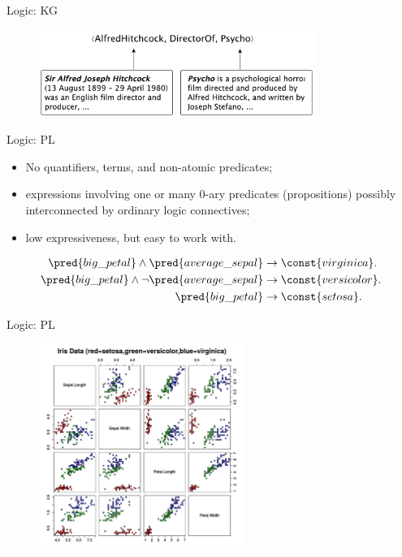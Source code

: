 \documentclass[presentation]{beamer}\mode<presentation>{\usetheme{AMSBolognaFC}}
\begin{document}
\begin{frame}[c]{Logic: KG}
    \begin{figure}
        \centering
        \includegraphics[width=0.8\textwidth]{figures/kg-example}
    \end{figure}    
\end{frame}

\begin{frame}[c]{Logic: PL}
    \begin{itemize}
        \item No quantifiers, terms, and non-atomic predicates;
        \item expressions involving one or many 0-ary predicates (propositions) possibly interconnected by ordinary logic connectives;
        \item low expressiveness, but easy to work with.
    \end{itemize}
    \vfill\centering
    \begin{equation*}
        \begin{aligned}
            \pred{big\_petal}\wedge\pred{average\_sepal}&\rightarrow\const{virginica}.\\
            \pred{big\_petal}\wedge\neg\pred{average\_sepal}&\rightarrow\const{versicolor}.\\
            \pred{big\_petal}&\rightarrow\const{setosa}. 
        \end{aligned}    
    \end{equation*}
\end{frame}

\begin{frame}[c]{Logic: PL}
    \begin{figure}
        \centering
        \includegraphics[width=0.6\textwidth]{figures/iris-dataset}
    \end{figure}

\end{frame}
\end{document}
